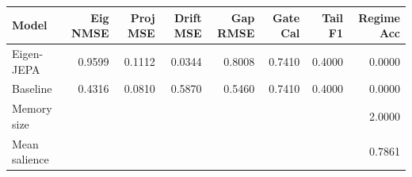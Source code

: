 \begin{tabular}{lrrrrrrr}
\toprule
Model & Eig NMSE & Proj MSE & Drift MSE & Gap RMSE & Gate Cal & Tail F1 & Regime Acc \\
\midrule
Eigen-JEPA & 0.9599 & 0.1112 & 0.0344 & 0.8008 & 0.7410 & 0.4000 & 0.0000 \\
Baseline & 0.4316 & 0.0810 & 0.5870 & 0.5460 & 0.7410 & 0.4000 & 0.0000 \\
\midrule
Memory size & \multicolumn{7}{r}{2.0000} \\
Mean salience & \multicolumn{7}{r}{0.7861} \\
\bottomrule
\end{tabular}